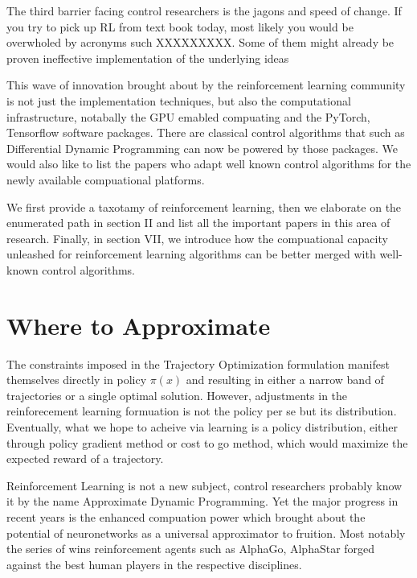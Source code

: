 \documentclass[journal]{IEEEtran}
\begin{document}
The third barrier facing control researchers is the jagons and speed of change. If you try to pick up RL from text book today, most likely you would be overwholed by acronyms such XXXXXXXXX. Some of them might already be proven ineffective implementation of the underlying ideas

This wave of innovation brought about by the reinforcement learning community is not just the implementation techniques, but also the computational infrastructure, notabally the GPU emabled compuating and the PyTorch, Tensorflow software packages. There are classical control algorithms that such as Differential Dynamic Programming can now be powered by those packages. We would also like to list the papers who adapt well known control algorithms for the newly available compuational platforms.

We first provide a taxotamy of reinforcement learning, then we elaborate on the enumerated path in section II and list all the important papers in this area of research. Finally, in section VII, we introduce how the compuational capacity unleashed for reinforcement learning algorithms can be better merged with well-known control algorithms.

\section{Where to Approximate}
The constraints imposed in the Trajectory Optimization formulation manifest themselves directly in policy $\pi(x)$ and resulting in either a narrow band of trajectories or a single optimal solution. However, adjustments in the reinforecement learning formuation is not the policy per se but its distribution. Eventually, what we hope to acheive via learning is a policy distribution, either through policy gradient method or cost to go method, which would maximize the expected reward of a trajectory.

Reinforcement Learning is not a new subject, control researchers probably know it by the name Approximate Dynamic Programming. Yet the major progress in recent years is the enhanced compuation power which brought about the potential of neuronetworks as a universal approximator \cite{Hornik1991ApproximationCO} to fruition. Most notably the series of wins reinforcement agents such as AlphaGo, AlphaStar forged against the best human players in the respective disciplines.
\end{document}
